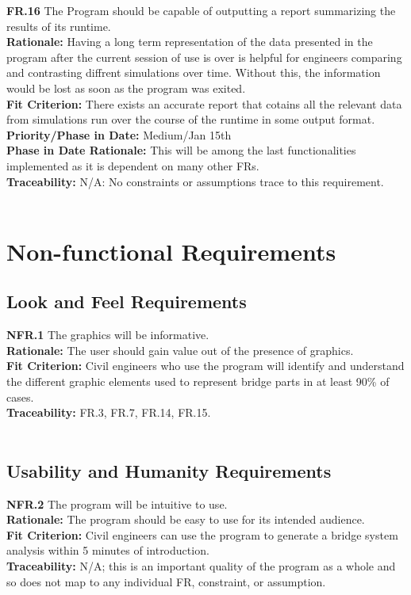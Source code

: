 \documentclass[12pt]{article}
\begin{document}
  \noindent\textbf{FR.16} The Program should be capable of outputting a report summarizing the results of its runtime.\\
  \textbf{Rationale:} Having a long term representation of the data presented in the program after the current session of use is over is helpful for engineers comparing
  and contrasting diffrent simulations over time. Without this, the information would be lost as soon as the program was exited.\\
  \textbf{Fit Criterion:} There exists an accurate report that cotains all the relevant data from simulations run over the course of the runtime in some output format.\\
  \textbf{Priority/Phase in Date:} Medium/Jan 15th\\
  \textbf{Phase in Date Rationale:} This will be among the last functionalities implemented as it is dependent on many other FRs.\\
  \textbf{Traceability:} N/A: No constraints or assumptions trace to this requirement.\\\\


\section{Non-functional Requirements}

\subsection{Look and Feel Requirements}

  \textbf{NFR.1} The graphics will be informative.\\
  \textbf{Rationale:} The user should gain value out of the presence of graphics.\\
  \textbf{Fit Criterion:} Civil engineers who use the program will identify and understand the different graphic elements used to represent bridge parts in at least 90\% of cases.\\
  \textbf{Traceability:} FR.3, FR.7, FR.14, FR.15.\\\\

\subsection{Usability and Humanity Requirements}

  \textbf{NFR.2} The program will be intuitive to use.\\
  \textbf{Rationale:} The program should be easy to use for its intended audience.\\
  \textbf{Fit Criterion:} Civil engineers can use the program to generate a bridge system analysis within 5 minutes of introduction.\\
  \textbf{Traceability:} N/A; this is an important quality of the program as a whole and so does not map to any individual FR, constraint, or assumption.\\\\
\end{document}
